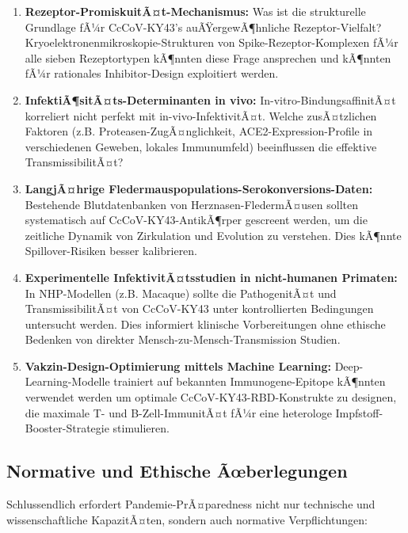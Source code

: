 ﻿\documentclass[11pt,a4paper]{article}
\theoremstyle{definition}
\begin{document}
\begin{enumerate}
\item \textbf{Rezeptor-PromiskuitÃ¤t-Mechanismus:} Was ist die strukturelle Grundlage fÃ¼r CcCoV-KY43's auÃŸergewÃ¶hnliche Rezeptor-Vielfalt? Kryoelektronenmikroskopie-Strukturen von Spike-Rezeptor-Komplexen fÃ¼r alle sieben Rezeptortypen kÃ¶nnten diese Frage ansprechen und kÃ¶nnten fÃ¼r rationales Inhibitor-Design exploitiert werden.

\item \textbf{InfektiÃ¶sitÃ¤ts-Determinanten in vivo:} In-vitro-BindungsaffinitÃ¤t korreliert nicht perfekt mit in-vivo-InfektivitÃ¤t. Welche zusÃ¤tzlichen Faktoren (z.B. Proteasen-ZugÃ¤nglichkeit, ACE2-Expression-Profile in verschiedenen Geweben, lokales Immunumfeld) beeinflussen die effektive TransmissibilitÃ¤t?

\item \textbf{LangjÃ¤hrige Fledermauspopulations-Serokonversions-Daten:} Bestehende Blutdatenbanken von Herznasen-FledermÃ¤usen sollten systematisch auf CcCoV-KY43-AntikÃ¶rper gescreent werden, um die zeitliche Dynamik von Zirkulation und Evolution zu verstehen. Dies kÃ¶nnte Spillover-Risiken besser kalibrieren.

\item \textbf{Experimentelle InfektivitÃ¤tsstudien in nicht-humanen Primaten:} In NHP-Modellen (z.B. Macaque) sollte die PathogenitÃ¤t und TransmissibilitÃ¤t von CcCoV-KY43 unter kontrollierten Bedingungen untersucht werden. Dies informiert klinische Vorbereitungen ohne ethische Bedenken von direkter Mensch-zu-Mensch-Transmission Studien.

\item \textbf{Vakzin-Design-Optimierung mittels Machine Learning:} Deep-Learning-Modelle trainiert auf bekannten Immunogene-Epitope kÃ¶nnten verwendet werden um optimale CcCoV-KY43-RBD-Konstrukte zu designen, die maximale T- und B-Zell-ImmunitÃ¤t fÃ¼r eine heterologe Impfstoff-Booster-Strategie stimulieren.
\end{enumerate}

\subsection{Normative und Ethische Ãœberlegungen}

Schlussendlich erfordert Pandemie-PrÃ¤paredness nicht nur technische und wissenschaftliche KapazitÃ¤ten, sondern auch normative Verpflichtungen:
\end{document}
